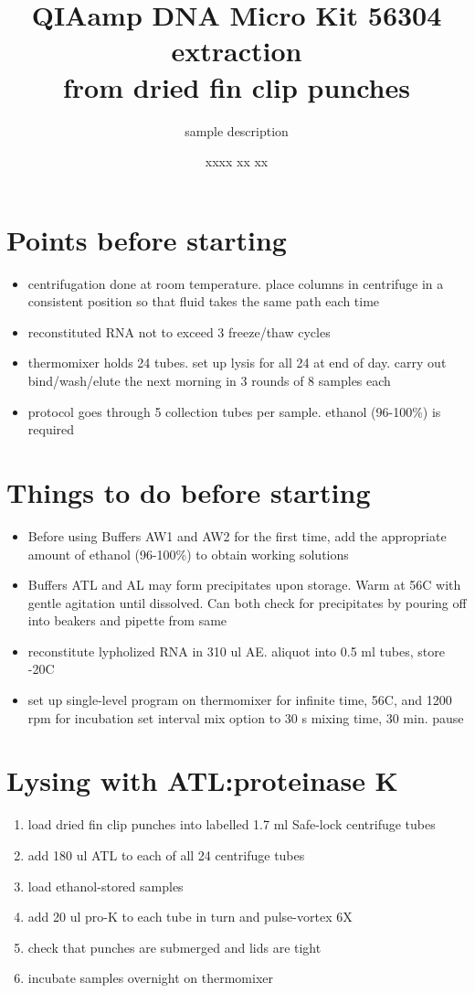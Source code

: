 \documentclass{article}
\title{QIAamp DNA Micro Kit 56304 extraction \\ from dried fin clip punches}
\author{sample description}
\date{xxxx xx xx}
\begin{document}
\maketitle

\section*{Points before starting}
\begin{itemize}
    \item centrifugation done at room temperature. place columns in centrifuge in a consistent position so that fluid takes the same path each time
    \item reconstituted RNA not to exceed 3 freeze/thaw cycles
    \item thermomixer holds 24 tubes. set up lysis for all 24 at end of day. carry out bind/wash/elute the next morning in 3 rounds of 8 samples each
    \item protocol goes through 5 collection tubes per sample. ethanol (96-100\%) is required
\end{itemize}

\section*{Things to do before starting}
\begin{itemize}
    \item Before using Buffers AW1 and AW2 for the first time, add the appropriate amount of ethanol (96-100\%) to obtain working solutions
    \item Buffers ATL and AL may form precipitates upon storage. Warm at 56C with gentle agitation until dissolved. Can both check for precipitates by pouring off into beakers and pipette from same
    \item reconstitute lypholized RNA in 310 ul AE. aliquot into 0.5 ml tubes, store -20C
    \item set up single-level program on thermomixer for infinite time, 56C, and 1200 rpm for incubation
        \subitem set interval mix option to 30 s mixing time, 30 min. pause
\end{itemize}

\section*{Lysing with ATL:proteinase K}
\begin{enumerate}
    \item load dried fin clip punches into labelled 1.7 ml Safe-lock centrifuge tubes
    \item add 180 ul ATL to each of all 24 centrifuge tubes
    \item load ethanol-stored samples
    \item add 20 ul pro-K to each tube in turn and pulse-vortex 6X
    \item check that punches are submerged and lids are tight
    \item incubate samples overnight on thermomixer 

\end{enumerate}
\end{document}
